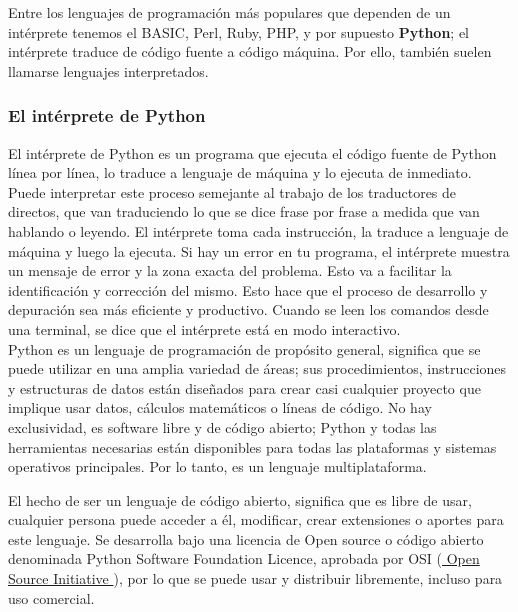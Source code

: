 Entre los lenguajes de programación más populares que dependen de un intérprete  tenemos el BASIC, Perl, Ruby, PHP, y por supuesto  {\bf{Python}};  el  intérprete  traduce  de código fuente a código máquina. Por ello, también suelen llamarse lenguajes interpretados.









\subsubsection*{El intérprete de Python}

El intérprete de Python es un programa que ejecuta el código fuente de Python línea por línea, lo traduce a lenguaje de máquina y lo ejecuta de inmediato.  Puede interpretar este proceso semejante al trabajo de los traductores de directos, que van traduciendo lo que se dice frase por frase a medida que van hablando o leyendo. El intérprete toma cada instrucción, la traduce a lenguaje de máquina y luego la ejecuta.
Si hay un error en tu programa, el intérprete muestra un mensaje de error y la zona exacta del problema. Esto va a facilitar la identificación y corrección del mismo. Esto hace que el proceso de desarrollo y depuración sea más eficiente y productivo.
Cuando se leen los comandos desde una terminal, se dice que el intérprete está en modo interactivo. \\


Python es un lenguaje de programación  de propósito general, significa que se puede utilizar en una amplia variedad de áreas; sus procedimientos, instrucciones y estructuras de datos están diseñados para crear casi cualquier proyecto que implique usar datos, cálculos matemáticos o líneas de código. No hay exclusividad, es software libre y de código abierto; Python y todas las herramientas necesarias están disponibles para todas las plataformas y sistemas operativos principales.  Por lo tanto, es un lenguaje multiplataforma.

El hecho de ser un lenguaje de código abierto, significa que es libre de usar, cualquier persona puede acceder a él,  modificar, crear extensiones o aportes para este lenguaje. Se desarrolla bajo una licencia de Open source o código abierto denominada Python Software Foundation Licence,  aprobada por OSI (\href{https://es.wikipedia.org/wiki/Open_Source_Initiative}{\color{vino} Open Source Initiative }), por lo que se puede usar y distribuir libremente, incluso para uso comercial.\\
 
